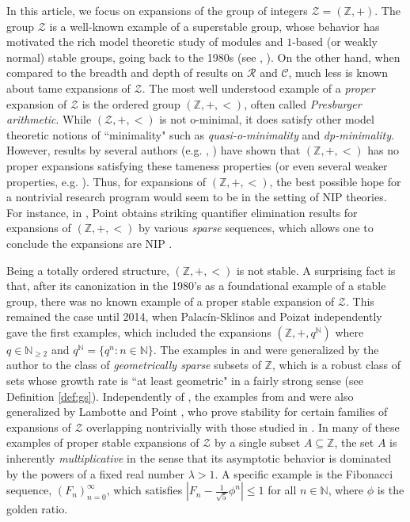 \documentclass{amsart}
\def\seq{\subseteq}
\newcommand{\cC}{\mathcal{C}}
\newcommand{\cR}{\mathcal{R}}
\newcommand{\cZ}{\mathcal{Z}}
\def\N{\mathbb N}
\def\Z{\mathbb Z}
\theoremstyle{definition}
\begin{document}
In this article, we focus on expansions of the group of integers $\cZ=(\Z,+)$. The group $\cZ$ is a well-known example of a superstable group, whose behavior has motivated the rich model theoretic study of modules and $1$-based (or weakly normal) stable groups, going back to the 1980s (see \cite{HrPi1B}, \cite{prestbook}). On the other hand, when compared to the breadth and depth of results on $\cR$ and $\cC$, much less is known about tame expansions of $\cZ$. The most well understood example of a \emph{proper} expansion of $\cZ$ is the ordered group $(\Z,+,<)$, often called \emph{Presburger arithmetic}. While $(\cZ,+,<)$ is not o-minimal, it does satisfy other model theoretic notions of ``minimality" such as \emph{quasi-o-minimality} and \emph{dp-minimality}. However, results by several authors (e.g. \cite{ADHMS1}, \cite{BPW}) have shown that $(\Z,+,<)$ has no proper expansions satisfying these tameness properties (or even several weaker properties, e.g. \cite{DoGo}). Thus, for expansions of $(\Z,+,<)$, the best possible hope for a nontrivial research program would seem to be in the setting of NIP theories.  For instance, in \cite{PointPA}, Point obtains striking quantifier elimination results for expansions of $(\Z,+,<)$ by various \emph{sparse} sequences, which allows one to conclude the expansions are NIP \cite{ADHMS2}. 

Being a totally ordered structure, $(\Z,+,<)$ is not stable. A surprising fact is that, after its canonization in the 1980's as a foundational example of a stable group, there was no known example of a proper stable expansion of $\cZ$. This remained the case until 2014, when Palac\'{i}n-Sklinos \cite{PaSk} and Poizat \cite{PoZ} independently gave the first examples, which included the expansions $(\Z,+,q^{\N})$ where $q\in\N_{\geq 2}$ and $q^{\N}=\{q^n:n\in\N\}$. The examples in \cite{PaSk} and \cite{PoZ} were generalized by the author \cite{CoSS} to the class of \emph{geometrically sparse} subsets of $\Z$, which is a robust class of sets whose growth rate is ``at least geometric" in a fairly strong sense (see Definition \ref{def:gs}).  Independently of \cite{CoSS}, the examples from \cite{PaSk} and \cite{PoZ} were also generalized by Lambotte and Point \cite{PoLa}, who prove stability for certain families of expansions of $\cZ$ overlapping nontrivially with those studied in \cite{CoSS}. In many of these examples of proper stable expansions of $\cZ$ by a single subset $A\seq\Z$, the set $A$ is inherently \emph{multiplicative}  in the sense that its asymptotic behavior is dominated by the powers of a fixed real number $\lambda>1$. A specific example is the Fibonacci sequence, $(F_n)_{n=0}^\infty$, which satisfies $|F_n-\frac{1}{\sqrt{5}}\phi^n|\leq 1$ for all $n\in\N$, where $\phi$ is the golden ratio. 
\end{document}
